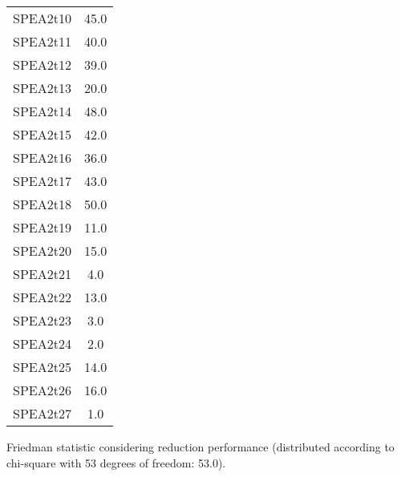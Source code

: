 \documentclass{article}
\begin{document}
\begin{table}[!htp]
\begin{tabular}{c|c}
SPEA2t10&45.0\\
SPEA2t11&40.0\\
SPEA2t12&39.0\\
SPEA2t13&20.0\\
SPEA2t14&48.0\\
SPEA2t15&42.0\\
SPEA2t16&36.0\\
SPEA2t17&43.0\\
SPEA2t18&50.0\\
SPEA2t19&11.0\\
SPEA2t20&15.0\\
SPEA2t21&4.0\\
SPEA2t22&13.0\\
SPEA2t23&3.0\\
SPEA2t24&2.0\\
SPEA2t25&14.0\\
SPEA2t26&16.0\\
SPEA2t27&1.0\\
\end{tabular}
\end{table}


Friedman statistic considering reduction performance (distributed according to chi-square with 53 degrees of freedom: 53.0).
\end{document}

